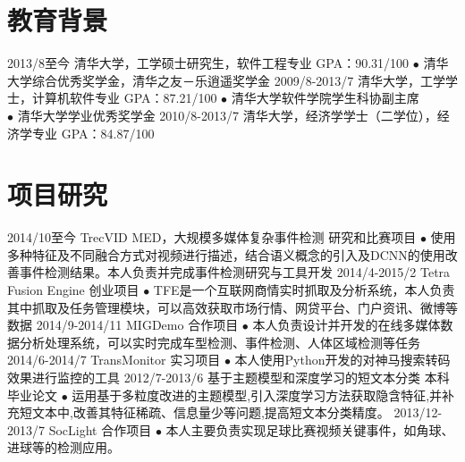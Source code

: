 \documentclass[]{friggeri-cv-cn}
\begin{document}

\section{教育背景}

\begin{entrylist}
  \entry
    {2013/8至今}
    {清华大学，工学硕士研究生，软件工程专业}
    {GPA：90.31/100}
    {
    $\bullet$ 清华大学综合优秀奖学金，清华之友－乐逍遥奖学金
    }
  \entry
    {2009/8-2013/7}
    {清华大学，工学学士，计算机软件专业}
    {GPA：87.21/100}
    {
    $\bullet$ 清华大学软件学院学生科协副主席\\
    $\bullet$ 清华大学学业优秀奖学金
    }
  \entry
    {2010/8-2013/7}
    {清华大学，经济学学士（二学位），经济学专业}
    {GPA：84.87/100}
    {}
\end{entrylist}

\section{项目研究}

\begin{entrylist}
  \entry
    {2014/10至今}
    {TrecVID MED，大规模多媒体复杂事件检测}
    {研究和比赛项目}
    {$\bullet$ 使用多种特征及不同融合方式对视频进行描述，结合语义概念的引入及DCNN的使用改善事件检测结果。本人负责并完成事件检测研究与工具开发}
  \entry
    {2014/4-2015/2}
    {Tetra Fusion Engine}
    {创业项目}
    {$\bullet$ TFE是一个互联网商情实时抓取及分析系统，本人负责其中抓取及任务管理模块，可以高效获取市场行情、网贷平台、门户资讯、微博等数据}
  \entry
    {2014/9-2014/11}
    {MIGDemo}
    {合作项目}
    {$\bullet$ 本人负责设计并开发的在线多媒体数据分析处理系统，可以实时完成车型检测、事件检测、人体区域检测等任务}
  \entry
    {2014/6-2014/7}
    {TransMonitor}
    {实习项目}
    {$\bullet$ 本人使用Python开发的对神马搜索转码效果进行监控的工具}
  \entry
    {2012/7-2013/6}
    {基于主题模型和深度学习的短文本分类}
    {本科毕业论文}
    {$\bullet$ 运用基于多粒度改进的主题模型,引入深度学习方法获取隐含特征,并补充短文本中,改善其特征稀疏、信息量少等问题,提高短文本分类精度。}
  \entry
    {2013/12-2013/7}
    {SocLight}
    {合作项目}
    {$\bullet$ 本人主要负责实现足球比赛视频关键事件，如角球、进球等的检测应用。}
\end{entrylist}

\end{document}

